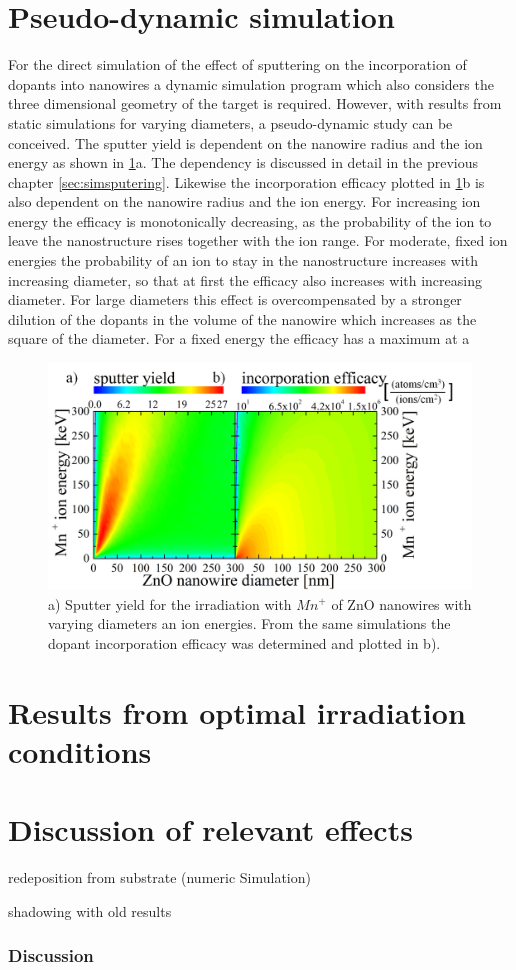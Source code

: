 \section{Pseudo-dynamic simulation}

For the direct simulation of the effect of sputtering on the incorporation of dopants into nanowires a dynamic simulation program which also considers the three dimensional geometry of the target is required. However, with results from static simulations for varying diameters, a pseudo-dynamic study can be conceived. The sputter yield is dependent on the nanowire radius and the ion energy as shown in \ref{sputterincorporate}a. The dependency is discussed in detail in the previous chapter \ref{sec:simsputering}. Likewise the incorporation efficacy plotted in \ref{sputterincorporate}b is also dependent on the nanowire radius and the ion energy. For increasing ion energy the efficacy is monotonically decreasing, as the probability of the ion to leave the nanostructure rises together with the ion range. For moderate, fixed ion energies the probability of an ion to stay in the nanostructure increases with increasing diameter, so that at first the efficacy also increases with increasing diameter. For large diameters this effect is overcompensated by a stronger dilution of the dopants in the volume of the nanowire which increases as the square of the diameter. For a fixed energy the efficacy has a maximum at a 
 

\begin{figure}
	\centering
		\includegraphics[width=.85\textwidth]{images/sputterincorporate.png}
	\caption{a) Sputter yield for the irradiation with $Mn^+$ of ZnO nanowires with varying diameters an ion energies. From the same simulations the dopant incorporation efficacy was determined and plotted in b).}
	\label{sputterincorporate}
\end{figure} 


\section{Results from optimal irradiation conditions}

\section{Discussion of relevant effects}

redeposition from substrate (numeric Simulation)

shadowing with old results

\subsubsection{Discussion}